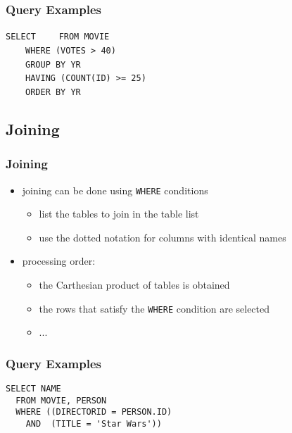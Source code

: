 \documentclass[dvipsnames]{beamer}
\theoremstyle{plain}
\begin{document}
\begin{frame}[fragile]
  \frametitle{Query Examples}

  \begin{example}
\lstinline!SELECT! 
~~~~\lstinline!FROM MOVIE!\\
\pause
~~~~\lstinline!WHERE (VOTES > 40)!\\
\pause
~~~~\lstinline!GROUP BY YR!\\
\pause
~~~~\lstinline!HAVING (COUNT(ID) >= 25)!\\
\pause\pause
~~~~\lstinline!ORDER BY YR!
  \end{example}
\end{frame}

\subsection{Joining}

\begin{frame}
  \frametitle{Joining}

  \begin{itemize}
    \item joining can be done using \lstinline!WHERE! conditions
    \begin{itemize}
      \item list the tables to join in the table list
      \item use the dotted notation for columns with identical names
    \end{itemize}

    \pause
    \item processing order:
    \begin{itemize}
      \item the Carthesian product of tables is obtained
      \item the rows that satisfy the \lstinline!WHERE! condition are selected
      \item ...
    \end{itemize}
  \end{itemize}
\end{frame}

\begin{frame}[fragile]
  \frametitle{Query Examples}

  \begin{example}
    \begin{lstlisting}
SELECT NAME
  FROM MOVIE, PERSON
  WHERE ((DIRECTORID = PERSON.ID)
    AND  (TITLE = 'Star Wars'))
    \end{lstlisting}
  \end{example}
\end{frame}
\end{document}
